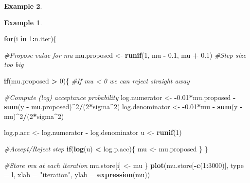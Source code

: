 \documentclass[
]{book}
\newenvironment{Shaded}{\begin{snugshade}}{\end{snugshade}}
\newcommand{\AttributeTok}[1]{\textcolor[rgb]{0.13,0.29,0.53}{#1}}
\newcommand{\CommentTok}[1]{\textcolor[rgb]{0.56,0.35,0.01}{\textit{#1}}}
\newcommand{\ControlFlowTok}[1]{\textcolor[rgb]{0.13,0.29,0.53}{\textbf{#1}}}
\newcommand{\DecValTok}[1]{\textcolor[rgb]{0.00,0.00,0.81}{#1}}
\newcommand{\FloatTok}[1]{\textcolor[rgb]{0.00,0.00,0.81}{#1}}
\newcommand{\FunctionTok}[1]{\textcolor[rgb]{0.13,0.29,0.53}{\textbf{#1}}}
\newcommand{\NormalTok}[1]{#1}
\newcommand{\OtherTok}[1]{\textcolor[rgb]{0.56,0.35,0.01}{#1}}
\newcommand{\SpecialCharTok}[1]{\textcolor[rgb]{0.81,0.36,0.00}{\textbf{#1}}}
\newcommand{\StringTok}[1]{\textcolor[rgb]{0.31,0.60,0.02}{#1}}
\theoremstyle{definition}
\theoremstyle{definition}
\newtheorem{example}{Example}[chapter]
\theoremstyle{definition}
\theoremstyle{definition}
\theoremstyle{remark}
\begin{document}
\begin{example}
\begin{example}
\begin{Shaded}
\begin{Highlighting}[]
\ControlFlowTok{for}\NormalTok{(i }\ControlFlowTok{in} \DecValTok{1}\SpecialCharTok{:}\NormalTok{n.iter)\{}
  
  \CommentTok{\#Propose value for mu}
\NormalTok{  mu.proposed }\OtherTok{\textless{}{-}} \FunctionTok{runif}\NormalTok{(}\DecValTok{1}\NormalTok{, mu }\SpecialCharTok{{-}} \FloatTok{0.1}\NormalTok{, mu }\SpecialCharTok{+} \FloatTok{0.1}\NormalTok{) }\CommentTok{\#Step size too big}
  
  \ControlFlowTok{if}\NormalTok{(mu.proposed }\SpecialCharTok{\textgreater{}} \DecValTok{0}\NormalTok{)\{ }\CommentTok{\#If mu \textless{} 0 we can reject straight away}
    
    \CommentTok{\#Compute (log) acceptance probability}
\NormalTok{    log.numerator   }\OtherTok{\textless{}{-}} \SpecialCharTok{{-}}\FloatTok{0.01}\SpecialCharTok{*}\NormalTok{mu.proposed }\SpecialCharTok{{-}} 
                        \FunctionTok{sum}\NormalTok{(y }\SpecialCharTok{{-}}\NormalTok{ mu.proposed)}\SpecialCharTok{\^{}}\DecValTok{2}\SpecialCharTok{/}\NormalTok{(}\DecValTok{2}\SpecialCharTok{*}\NormalTok{sigma}\SpecialCharTok{\^{}}\DecValTok{2}\NormalTok{)}
\NormalTok{    log.denominator }\OtherTok{\textless{}{-}} \SpecialCharTok{{-}}\FloatTok{0.01}\SpecialCharTok{*}\NormalTok{mu }\SpecialCharTok{{-}} \FunctionTok{sum}\NormalTok{(y }\SpecialCharTok{{-}}\NormalTok{ mu)}\SpecialCharTok{\^{}}\DecValTok{2}\SpecialCharTok{/}\NormalTok{(}\DecValTok{2}\SpecialCharTok{*}\NormalTok{sigma}\SpecialCharTok{\^{}}\DecValTok{2}\NormalTok{)}
    
\NormalTok{    log.p.acc }\OtherTok{\textless{}{-}}\NormalTok{ log.numerator }\SpecialCharTok{{-}}\NormalTok{ log.denominator}
\NormalTok{    u }\OtherTok{\textless{}{-}} \FunctionTok{runif}\NormalTok{(}\DecValTok{1}\NormalTok{)}
    
    \CommentTok{\#Accept/Reject step}
    \ControlFlowTok{if}\NormalTok{(}\FunctionTok{log}\NormalTok{(u) }\SpecialCharTok{\textless{}}\NormalTok{ log.p.acc)\{}
\NormalTok{      mu }\OtherTok{\textless{}{-}}\NormalTok{ mu.proposed}
\NormalTok{    \}}
\NormalTok{  \}}
  
  \CommentTok{\#Store mu at each iteration}
\NormalTok{  mu.store[i] }\OtherTok{\textless{}{-}}\NormalTok{ mu}
\NormalTok{\}}
\FunctionTok{plot}\NormalTok{(mu.store[}\SpecialCharTok{{-}}\FunctionTok{c}\NormalTok{(}\DecValTok{1}\SpecialCharTok{:}\DecValTok{3000}\NormalTok{)], }\AttributeTok{type =} \StringTok{\textquotesingle{}l\textquotesingle{}}\NormalTok{, }\AttributeTok{xlab =} \StringTok{"iteration"}\NormalTok{, }
     \AttributeTok{ylab =} \FunctionTok{expression}\NormalTok{(mu))}
\end{Highlighting}
\end{Shaded}


\end{example}
\end{example}
\end{document}
